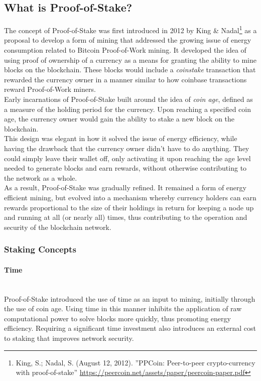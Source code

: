 \documentclass[11pt]{article}
\begin{document}
\subsection{What is Proof-of-Stake?}
The concept of Proof-of-Stake was first introduced in 2012 by King \& Nadal\footnote{King, S.; Nadal, S. (August 12, 2012). ”PPCoin: Peer-to-peer crypto-currency  with  proof-of-stake” \url{https://peercoin.net/assets/paper/peercoin-paper.pdf}} as a proposal to develop a form of mining that addressed the growing issue of energy consumption related to Bitcoin Proof-of-Work mining. It developed the idea of using proof of ownership of a currency as a means for granting the ability to mine blocks on the blockchain. These blocks would include a \textit{coinstake} transaction that rewarded the currency owner in a manner similar to how coinbase transactions reward Proof-of-Work miners.\\

\noindent Early incarnations of Proof-of-Stake built around the idea of \textit{coin age}, defined as a measure of the holding period for the currency. Upon reaching a specified coin age, the currency owner would gain the ability to stake a new block on the blockchain.\\

\noindent This design was elegant in how it solved the issue of energy efficiency, while having the drawback that the currency owner didn't have to do anything. They could simply leave their wallet off, only activating it upon reaching the age level needed to generate blocks and earn rewards, without otherwise contributing to the network as a whole.\\

\noindent As a result, Proof-of-Stake was gradually refined. It remained a form of energy efficient mining, but evolved into a mechanism whereby currency holders can earn rewards proportional to the size of their holdings in return for keeping a node up and running at all (or nearly all) times, thus contributing to the operation and security of the blockchain network.\\

\subsubsection{Staking Concepts}

\paragraph{Time} ~\\
Proof-of-Stake introduced the use of time as an input to mining, initially through the use of coin age. Using time in this manner inhibits the application of raw computational power to solve blocks more quickly, thus promoting energy efficiency. Requiring a significant time investment also introduces an external cost to staking that improves network security. 
\end{document}
